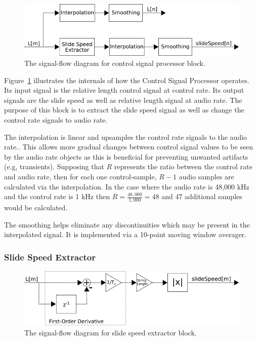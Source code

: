 \documentclass[../main.tex]{subfiles}
\begin{document}
\begin{figure}[h]
    \centering
    \includegraphics[scale=.65]{./images/diagrams/controlSignalProcessor.png}
    \caption{The signal-flow diagram for control signal processor block.}
    \label{fig:CSP}
\end{figure}

Figure~\ref{fig:CSP} illustrates the internals of how the Control Signal Processor operates. Its input signal is the relative length control signal at control rate. Its output signals are the slide speed as well as relative length signal at audio rate. The purpose of this block is to extract the slide speed signal as well as change the control rate signals to audio rate.

The interpolation is linear and upsamples the control rate signals to the audio rate.. This allows more gradual changes between control signal values to be seen by the audio rate objects as this is beneficial for preventing unwanted artifacts (e.g, transients). Supposing that $R$ represents the ratio between the control rate and audio rate, then for each one control-sample, $R-1$ audio samples are calculated via the interpolation. In the case where the audio rate is 48,000 kHz and the control rate is 1 kHz then $R = \frac{48,000}{1,000} = 48$ and 47 additional samples would be calculated.

The smoothing helps eliminate any discontinuities which may be present in the interpolated signal. It is implemented via a 10-point moving window averager.

\subsubsection{Slide Speed Extractor}

\begin{figure}[h]
    \centering
    \includegraphics[scale=.5]{./images/diagrams/slideSpeedExtractor.png}
    \caption{The signal-flow diagram for slide speed extractor block.}
    \label{fig:SSE}
\end{figure}
\end{document}
